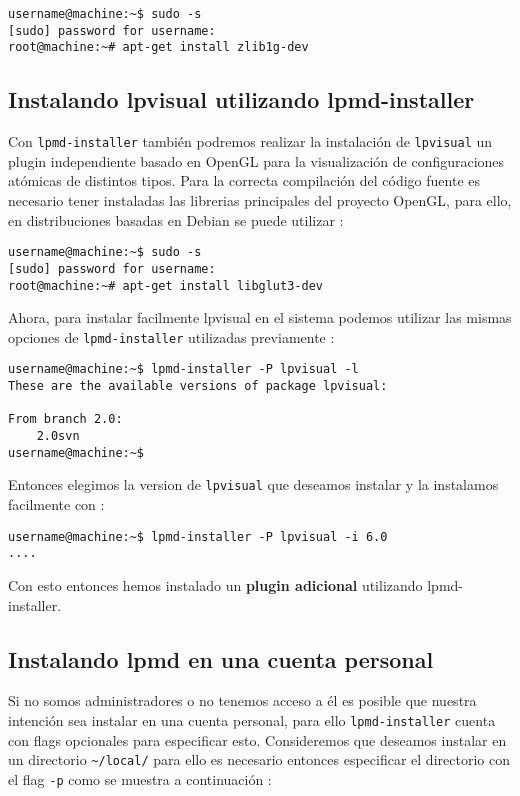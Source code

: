 \begin{verbatim}
username@machine:~$ sudo -s
[sudo] password for username: 
root@machine:~# apt-get install zlib1g-dev
\end{verbatim}


\subsection{Instalando lpvisual utilizando lpmd-installer}

Con \verb|lpmd-installer| tambi\'en podremos realizar la instalaci\'on de \verb|lpvisual| un plugin independiente basado en OpenGL para la visualizaci\'on de configuraciones at\'omicas de distintos tipos. Para la correcta compilaci\'on del c\'odigo fuente es necesario tener instaladas las librerias principales del proyecto OpenGL, para ello, en distribuciones basadas en Debian se puede utilizar :

\begin{verbatim}
username@machine:~$ sudo -s
[sudo] password for username: 
root@machine:~# apt-get install libglut3-dev
\end{verbatim}

Ahora, para instalar facilmente lpvisual en el sistema podemos utilizar las mismas opciones de \verb|lpmd-installer| utilizadas previamente :

\begin{verbatim}
username@machine:~$ lpmd-installer -P lpvisual -l
These are the available versions of package lpvisual:

From branch 2.0: 
    2.0svn
username@machine:~$  
\end{verbatim}

Entonces elegimos la version de \verb|lpvisual| que deseamos instalar y la instalamos facilmente con :

\begin{verbatim}
username@machine:~$ lpmd-installer -P lpvisual -i 6.0
....
\end{verbatim}

Con esto entonces hemos instalado un \textbf{plugin adicional} utilizando lpmd-installer.

\subsection{Instalando lpmd en una cuenta personal}

Si no somos administradores o no tenemos acceso a \'el es posible que nuestra intenci\'on sea instalar {\lpmd} en una cuenta personal, para ello \verb|lpmd-installer| cuenta con flags opcionales para especificar  esto. Consideremos que deseamos instalar {\lpmd} en un directorio \verb|~/local/| para ello es necesario entonces especificar el directorio con el flag \verb|-p| como se muestra a continuaci\'on :

